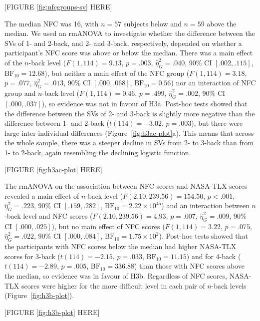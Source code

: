 \documentclass[
  man,floatsintext]{apa6}
\begin{document}
{[}FIGURE \ref{fig:nfcgroups-sv} HERE{]}

The median NFC was 16, with \(n=57\) subjects below and \(n=59\) above the median.
We used an rmANOVA to investigate whether the difference between the SVs of 1- and 2-back, and 2- and 3-back, respectively, depended on whether a participant's NFC score was above or below the median.
There was a main effect of the \(n\)-back level (\(F(1, 114) = 9.13\), \(p = .003\), \(\hat{\eta}^2_G = .040\), 90\% CI \([.002, .115]\), \(\mathrm{BF}_{\textrm{10}} = 12.68\)), but neither a main effect of the NFC group (\(F(1, 114) = 3.18\), \(p = .077\), \(\hat{\eta}^2_G = .013\), 90\% CI \([.000, .068]\), \(\mathrm{BF}_{\textrm{10}} = 0.56\)) nor an interaction of NFC group and \(n\)-back level (\(F(1, 114) = 0.46\), \(p = .499\), \(\hat{\eta}^2_G = .002\), 90\% CI \([.000, .037]\)), so evidence was not in favour of H3a.
Post-hoc tests showed that the difference between the SVs of 2- and 3-back is slightly more negative than the difference between 1- and 2-back (\(t(114) = -3.02\), \(p = .003\)), but there were large inter-individual differences (Figure~\ref{fig:h3ac-plot}a).
This means that across the whole sample, there was a steeper decline in SVs from 2- to 3-back than from 1- to 2-back, again resembling the declining logistic function.

{[}FIGURE \ref{fig:h3ac-plot} HERE{]}

The rmANOVA on the association between NFC scores and NASA-TLX scores revealed a main effect of \(n\)-back level (\(F(2.10, 239.56) = 154.50\), \(p < .001\), \(\hat{\eta}^2_G = .223\), 90\% CI \([.159, .282]\), \(\mathrm{BF}_{\textrm{10}} = 2.22 \times 10^{45}\)) and an interaction between \(n\)-back level and NFC scores (\(F(2.10, 239.56) = 4.93\), \(p = .007\), \(\hat{\eta}^2_G = .009\), 90\% CI \([.000, .025]\)), but no main effect of NFC scores (\(F(1, 114) = 3.22\), \(p = .075\), \(\hat{\eta}^2_G = .022\), 90\% CI \([.000, .084]\), \(\mathrm{BF}_{\textrm{10}} = 1.75 \times 10^{2}\)).
Post-hoc tests showed that the participants with NFC scores below the median had higher NASA-TLX scores for 3-back (\(t(114) = -2.15\), \(p = .033\), \(\mathrm{BF}_{\textrm{10}} = 11.15\)) and for 4-back (\(t(114) = -2.89\), \(p = .005\), \(\mathrm{BF}_{\textrm{10}} = 336.88\)) than those with NFC scores above the median, so evidence was in favour of H3b.
Regardless of NFC scores, NASA-TLX scores were higher for the more difficult level in each pair of \(n\)-back levels (Figure~\ref{fig:h3b-plot}).

{[}FIGURE \ref{fig:h3b-plot} HERE{]}
\end{document}
